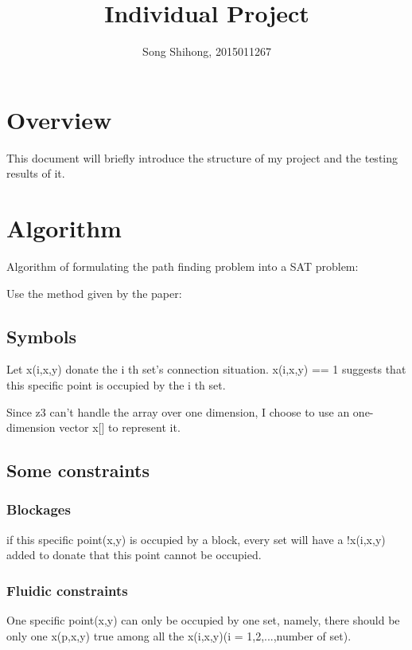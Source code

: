\documentclass[12pt, a4paper]{article}
\title{Individual Project}
\author{Song Shihong, 2015011267}
\begin{document}
	\maketitle
	
	\tableofcontents
	\newpage
	
	\section{Overview}

	This document will briefly introduce the structure of my project and the testing results of it.

	\section{Algorithm}

	Algorithm of formulating the path finding problem into a SAT problem: 

		Use the method given by the paper:

			\subsection{Symbols}

				Let x(i,x,y) donate the i th set's connection situation. x(i,x,y) == 1 suggests that this specific point is occupied by the i th set.

				Since z3 can't handle the array over one dimension, I choose to use an one-dimension vector x[] to represent it.

			\subsection{Some constraints}

				\subsubsection{Blockages}

					if this specific point(x,y) is occupied by a block, every set will have a !x(i,x,y) added to donate that this point cannot be occupied.

				\subsubsection{Fluidic constraints}

					One specific point(x,y) can only be occupied by one set, namely, there should be only one x(p,x,y) true among all the x(i,x,y)(i = 1,2,...,number of set).
\end{document}
